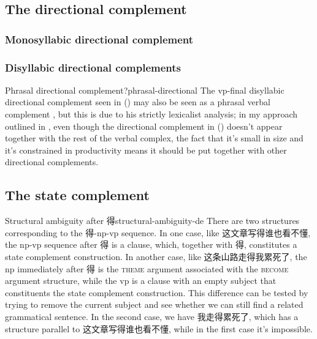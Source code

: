 \documentclass[UTF8, a4paper, oneside, scheme=plain, 12pt]{ctexrep}
\newcommand*{\citepage}[1]{p.~{#1}}
\newcommand*{\category}[1]{\textsc{#1}}
\begin{document}
\subsection{The directional complement}

\subsubsection{Monosyllabic directional complement}



\subsubsection{Disyllabic directional complements}

\begin{infobox}{Phrasal directional complement?}{phrasal-directional}
    The \acs{vp}-final disyllabic directional complement seen in 
    ()
    may also be seen as a phrasal verbal complement 
    \citep[\citepage{120}]{deng2010formal}, 
    but this is due to his strictly lexicalist analysis; 
    in my approach outlined in , 
    even though the directional complement in  
    ()
    doesn't appear together with the rest of the verbal complex, 
    the fact that it's small in size and  
    it's constrained in productivity
    means it should be put together with other directional complements. 
\end{infobox}

\subsection{The state complement}



\begin{infobox}{Structural ambiguity after 得}{structural-ambiguity-de}
    There are two structures corresponding to the 得-\acs{np}-\acs{vp} sequence.
    In one case, like 这文章写得谁也看不懂, the \acs{np}-\acs{vp} sequence after 得 is a clause, 
    which, together with 得, constitutes 
    a state complement construction.
    In another case, like 这条山路走得我累死了, 
    the \acs{np} immediately after 得 
    is the \category{theme} argument associated with the \category{become} argument structure, 
    while the \acs{vp} is a clause with an empty subject 
    that constituents the state complement construction.
    This difference can be tested by trying to remove the current subject 
    and see whether we can still find a related grammatical sentence. 
    In the second case, we have 我走得累死了, 
    which has a structure parallel to 这文章写得谁也看不懂, 
    while in the first case it's impossible. 
\end{infobox}
\end{document}
